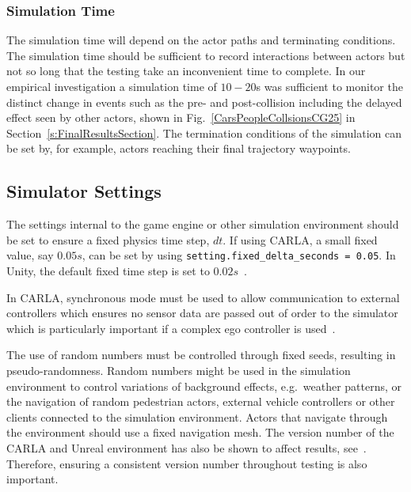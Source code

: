 \documentclass[letterpaper, 10 pt, journal, twoside]{IEEEtran}
\begin{document}


\subsubsection{Simulation Time} 
The simulation time will depend on the actor paths and terminating conditions. The simulation time should be sufficient to record interactions between actors but not so long that the testing take an inconvenient time to complete. In our empirical investigation a simulation time of $10-20$s was sufficient to monitor the distinct change in events such as the pre- and post-collision including the delayed effect seen by other actors, shown in Fig.~\ref{CarsPeopleCollsionsCG25} in Section~\ref{s:FinalResultsSection}. The termination conditions of the simulation can be set by, for example, actors reaching their final trajectory waypoints. 



\subsection{Simulator Settings}
The settings internal to the game engine or other simulation environment should be set to ensure a fixed physics time step, $dt$. If using CARLA, a small fixed value, say $0.05s$, can be set by using \texttt{setting.fixed\_delta\_seconds = 0.05}. In Unity, the default fixed time step is set to $0.02s$~\cite{MonoBehaviour_unity}. 

In CARLA, synchronous mode must be used to allow communication to external controllers which ensures no sensor data are passed out of order to the simulator which is particularly important if a complex ego controller is used~\cite{carla_sim_config}. 

The use of random numbers must be controlled through fixed seeds, resulting in pseudo-randomness. Random numbers might be used in the simulation environment to control variations of background effects, e.g.\ weather patterns, or the navigation of random pedestrian actors, external vehicle controllers or other clients connected to the simulation environment. 
%
Actors that navigate through the environment should use a fixed navigation mesh. 
%
The version number of the CARLA and Unreal environment has also be shown to affect results, see~\cite{TSLUnrealEngineTesting}. Therefore, ensuring a consistent version number throughout testing is also important.
\end{document}
